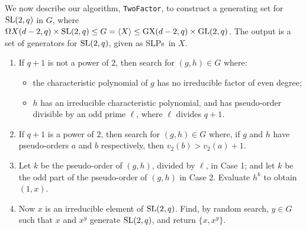 \documentclass[12pt]{article}
\def\SL{{\rm SL}}
\def\GL{{\rm GL}}
\def\GX{{\rm GX}}
\def\SLPs{{\rm SLPs}}
\begin{document}
We now describe our algorithm, {\tt TwoFactor}, to construct
a generating set for $\SL(2, q)$ in $G$, where
$\Omega X(d-2,q)\times\SL(2,q)\le G = \langle X \rangle 
\le \GX(d-2,q)\times\GL(2,q)$.
The output is a  set of generators for $\SL(2, q)$, 
given as \SLPs\ in $X$.
\begin{enumerate}
\item
If $q+1$ is not a power of $2$, then 
search for $(g, h) \in G$ where:
\begin{itemize}
\item
the characteristic polynomial of $g$ has no irreducible factor of even degree;
\item $h$ has an irreducible characteristic
polynomial, and has pseudo-order divisible by an odd prime $\ell$, where
$\ell$ divides $q+1$.
\end{itemize}

\item
If $q+1$ is a power of $2$, then 
search for $(g, h) \in G$ where, if $g$ and $h$ 
have pseudo-orders $a$ and $b$
respectively, then $v_2(b)>v_2(a)+1$.

\item
Let $k$ be the pseudo-order of $(g,h)$, divided by $\ell$, in Case 1;
and let $k$ be the odd part of the pseudo-order of $(g,h)$ in Case 2.
Evaluate $h^k$ to obtain $(1, x)$. 

\item
Now $x$ is an irreducible element of $\SL(2,q)$.
Find, by random search, $y \in G$ such that $x$ and $x^y$
generate $\SL(2,q)$, and return $\{x,x^y\}$.
\end{enumerate}
\end{document}
